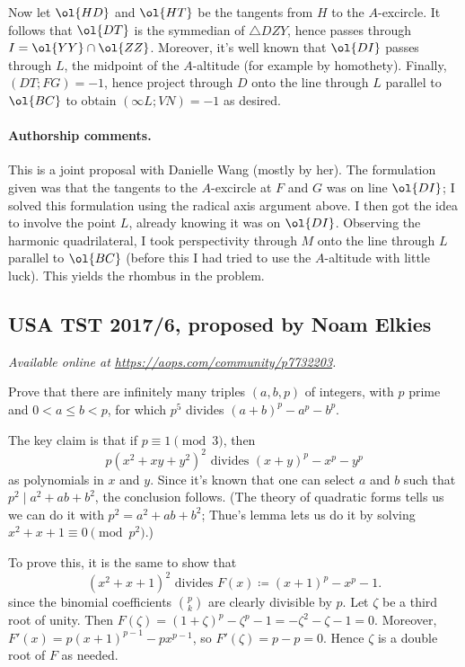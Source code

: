 \documentclass[11pt]{scrartcl}
\begin{document}
Now let $\ol{HD}$ and $\ol{HT}$ be the tangents
from $H$ to the $A$-excircle.
It follows that $\ol{DT}$ is the symmedian of $\triangle DZY$,
hence passes through $I = \ol{YY} \cap \ol{ZZ}$.
Moreover, it's well known that $\ol{DI}$ passes through $L$,
the midpoint of the $A$-altitude
(for example by homothety).
Finally, $(DT;FG) = -1$,
hence project through $D$ onto the line through $L$
parallel to $\ol{BC}$ to obtain $(\infty L; VN) = -1$ as desired.

\paragraph{Authorship comments.}
This is a joint proposal with Danielle Wang (mostly by her).
The formulation given was that the tangents to the $A$-excircle
at $F$ and $G$ was on line $\ol{DI}$;
I solved this formulation using the radical axis argument above.
I then got the idea to involve the point $L$,
already knowing it was on $\ol{DI}$.
Observing the harmonic quadrilateral,
I took perspectivity through $M$ onto the line through $L$ parallel to $\ol{BC}$
(before this I had tried to use the $A$-altitude with little luck).
This yields the rhombus in the problem.
\pagebreak

\subsection{USA TST 2017/6, proposed by Noam Elkies}
\textsl{Available online at \url{https://aops.com/community/p7732203}.}
\begin{mdframed}[style=mdpurplebox,frametitle={Problem statement}]
Prove that there are infinitely many triples $(a,b,p)$ of integers,
with $p$ prime and $0 < a \le b < p$,
for which $p^5$ divides $(a+b)^p - a^p - b^p$.
\end{mdframed}
The key claim is that if $p \equiv 1 \pmod 3$,
then
\[ p(x^2+xy+y^2)^2 \text{ divides } (x+y)^p - x^p - y^p \]
as polynomials in $x$ and $y$.
Since it's known that one can select $a$ and $b$ such that
$p^2 \mid a^2 + ab + b^2$, the conclusion follows.
(The theory of quadratic forms tells us we can do it with $p^2 = a^2+ab+b^2$;
Thue's lemma lets us do it by solving $x^2+x+1 \equiv 0 \pmod{p^2}$.)

To prove this, it is the same to show that
\[ (x^2+x+1)^2 \text{ divides } F(x) \coloneqq (x+1)^p - x^p - 1. \]
since the binomial coefficients $\binom pk$ are clearly divisible by $p$.
Let $\zeta$ be a third root of unity.
Then $F(\zeta) = (1+\zeta)^p - \zeta^p - 1 = -\zeta^2 - \zeta - 1 = 0$.
Moreover, $F'(x) = p(x+1)^{p-1} -  px^{p-1}$,
so $F'(\zeta) = p - p = 0$.
Hence $\zeta$ is a double root of $F$ as needed.
\end{document}
